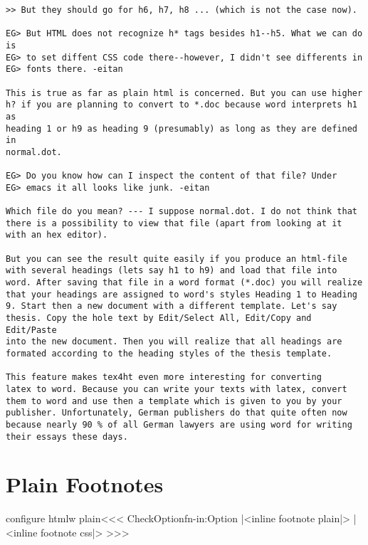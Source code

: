 \begin{verbatim}
>> But they should go for h6, h7, h8 ... (which is not the case now).

EG> But HTML does not recognize h* tags besides h1--h5. What we can do is
EG> to set diffent CSS code there--however, I didn't see differents in
EG> fonts there. -eitan

This is true as far as plain html is concerned. But you can use higher
h? if you are planning to convert to *.doc because word interprets h1 as
heading 1 or h9 as heading 9 (presumably) as long as they are defined in
normal.dot.

EG> Do you know how can I inspect the content of that file? Under
EG> emacs it all looks like junk. -eitan

Which file do you mean? --- I suppose normal.dot. I do not think that
there is a possibility to view that file (apart from looking at it
with an hex editor).

But you can see the result quite easily if you produce an html-file
with several headings (lets say h1 to h9) and load that file into
word. After saving that file in a word format (*.doc) you will realize
that your headings are assigned to word's styles Heading 1 to Heading
9. Start then a new document with a different template. Let's say
thesis. Copy the hole text by Edit/Select All, Edit/Copy and Edit/Paste
into the new document. Then you will realize that all headings are
formated according to the heading styles of the thesis template.

This feature makes tex4ht even more interesting for converting
latex to word. Because you can write your texts with latex, convert
them to word and use then a template which is given to you by your
publisher. Unfortunately, German publishers do that quite often now
because nearly 90 % of all German lawyers are using word for writing
their essays these days.
\end{verbatim}





\section{Plain Footnotes}

\<configure htmlw plain\><<<
\:CheckOption{fn-in}\if:Option  
   |<inline footnote plain|>
   |<inline footnote css|>
\fi
>>>


